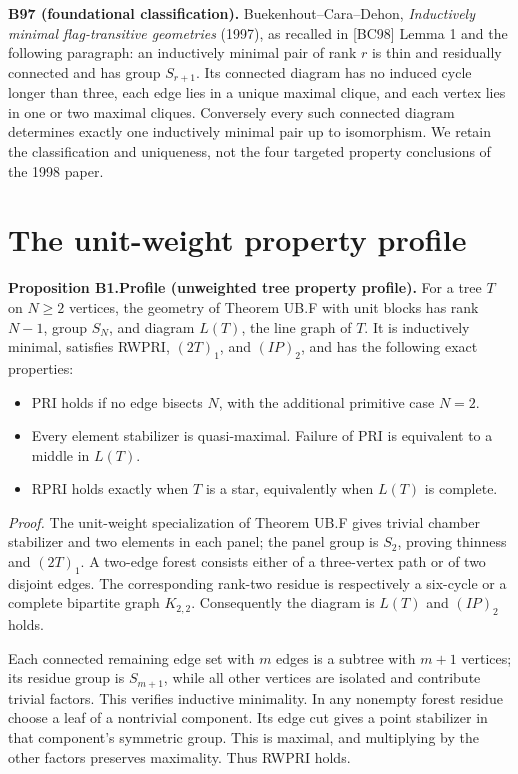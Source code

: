 \textbf{B97 (foundational classification).} Buekenhout--Cara--Dehon, \emph{Inductively minimal flag-transitive geometries} (1997), as recalled in {[}BC98{]} Lemma 1 and the following paragraph: an inductively minimal pair of rank \(r\) is thin and residually connected and has group \(S_{r+1}\). Its connected diagram has no induced cycle longer than three, each edge lies in a unique maximal clique, and each vertex lies in one or two maximal cliques. Conversely every such connected diagram determines exactly one inductively minimal pair up to isomorphism. We retain the classification and uniqueness, not the four targeted property conclusions of the 1998 paper.
\section{The unit-weight property profile}
\textbf{Proposition B1.Profile (unweighted tree property profile).} For a tree \(T\) on \(N\geq2\) vertices, the geometry of Theorem UB.F with unit blocks has rank \(N-1\), group \(S_N\), and diagram \(L(T)\), the line graph of \(T\). It is inductively minimal, satisfies RWPRI, \((2T)_1\), and \((IP)_2\), and has the following exact properties:

\begin{itemize}
\tightlist
\item
  PRI holds if no edge bisects \(N\), with the additional primitive case \(N=2\).
\item
  Every element stabilizer is quasi-maximal. Failure of PRI is equivalent to a middle in \(L(T)\).
\item
  RPRI holds exactly when \(T\) is a star, equivalently when \(L(T)\) is complete.
\end{itemize}

\emph{Proof.} The unit-weight specialization of Theorem UB.F gives trivial chamber stabilizer and two elements in each panel; the panel group is \(S_2\), proving thinness and \((2T)_1\). A two-edge forest consists either of a three-vertex path or of two disjoint edges. The corresponding rank-two residue is respectively a six-cycle or a complete bipartite graph \(K_{2,2}\). Consequently the diagram is \(L(T)\) and \((IP)_2\) holds.

Each connected remaining edge set with \(m\) edges is a subtree with \(m+1\) vertices; its residue group is \(S_{m+1}\), while all other vertices are isolated and contribute trivial factors. This verifies inductive minimality. In any nonempty forest residue choose a leaf of a nontrivial component. Its edge cut gives a point stabilizer in that component's symmetric group. This is maximal, and multiplying by the other factors preserves maximality. Thus RWPRI holds.

